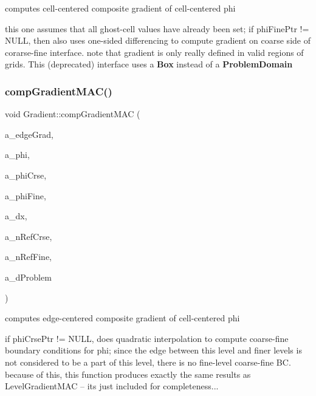 computes cell-\/centered composite gradient of cell-\/centered phi 

this one assumes that all ghost-\/cell values have already been set; if phi\+Fine\+Ptr != N\+U\+LL, then also uses one-\/sided differencing to compute gradient on coarse side of corarse-\/fine interface. note that gradient is only really defined in valid regions of grids. This (deprecated) interface uses a \textbf{ Box} instead of a \textbf{ Problem\+Domain} \mbox{\label{class_gradient_a50d364c2e9951e70a74200537ebbd73d}} 
\subsubsection{\texorpdfstring{comp\+Gradient\+M\+A\+C()}{compGradientMAC()}\hspace{0.1cm}{\footnotesize\ttfamily [1/3]}}
{\footnotesize\ttfamily void Gradient\+::comp\+Gradient\+M\+AC (\begin{DoxyParamCaption}\item[{\textbf{ Level\+Data}$<$ \textbf{ Flux\+Box} $>$ \&}]{a\+\_\+edge\+Grad,  }\item[{\textbf{ Level\+Data}$<$ \textbf{ F\+Array\+Box} $>$ \&}]{a\+\_\+phi,  }\item[{const \textbf{ Level\+Data}$<$ \textbf{ F\+Array\+Box} $>$ $\ast$}]{a\+\_\+phi\+Crse,  }\item[{const \textbf{ Level\+Data}$<$ \textbf{ F\+Array\+Box} $>$ $\ast$}]{a\+\_\+phi\+Fine,  }\item[{const \textbf{ Real}}]{a\+\_\+dx,  }\item[{const int}]{a\+\_\+n\+Ref\+Crse,  }\item[{const int}]{a\+\_\+n\+Ref\+Fine,  }\item[{const \textbf{ Box} \&}]{a\+\_\+d\+Problem }\end{DoxyParamCaption})\hspace{0.3cm}{\ttfamily [static]}}



computes edge-\/centered composite gradient of cell-\/centered phi 

if phi\+Crse\+Ptr != N\+U\+LL, does quadratic interpolation to compute coarse-\/fine boundary conditions for phi; since the edge between this level and finer levels is not considered to be a part of this level, there is no fine-\/level coarse-\/fine BC. because of this, this function produces exactly the same results as Level\+Gradient\+M\+AC -- it\textquotesingle{}s just included for completeness... \mbox{\label{class_gradient_ab53c80ecc42d684acd3456c47b4db5f2}} 
